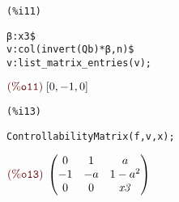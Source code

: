 \noindent
\begin{minipage}[t]{8ex}\color{red}\bf
\begin{verbatim}
(%i11) 
\end{verbatim}
\end{minipage}
\begin{minipage}[t]{\textwidth}\color{blue}
\begin{verbatim}
β:x3$
v:col(invert(Qb)*β,n)$
v:list_matrix_entries(v);
\end{verbatim}
\end{minipage}

\noindent
$\displaystyle
\parbox{8ex}{$\color{labelcolor}\mathrm{\tt (\%o11) }\quad $}
[0,-1,0]\mbox{}
$


\noindent
\begin{minipage}[t]{8ex}\color{red}\bf
\begin{verbatim}
(%i13) 
\end{verbatim}
\end{minipage}
\begin{minipage}[t]{\textwidth}\color{blue}
\begin{verbatim}
ControllabilityMatrix(f,v,x);
\end{verbatim}
\end{minipage}

\noindent
$\displaystyle
\parbox{8ex}{$\color{labelcolor}\mathrm{\tt (\%o13) }\quad $}
\begin{pmatrix}0 & 1 & a\cr -1 & -a & 1-{{a}^{2}}\cr 0 & 0 & \mathit{x3}\end{pmatrix}\mbox{}
$
